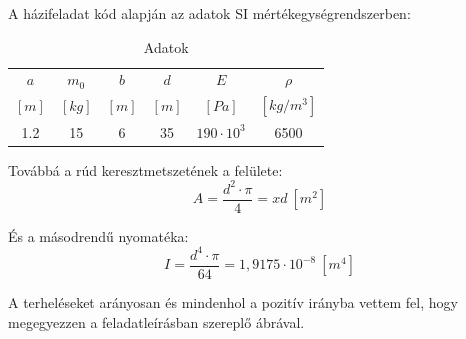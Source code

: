 \documentclass{article}
\begin{document}
	A házifeladat kód alapján az adatok SI mértékegységrendszerben:
	
	\begin{table}[h!]
		\begin{center}
			\caption{Adatok}
			\label{tab:table1}
			\begin{tabular}{c|c|c|c|c|c} %
				$a$ & $m_{0}$ & $b$ & $d$ & $E$ & $\rho$\\
				$[m]$ & $[kg]$ & $[m]$ & $[m]$ & $[Pa]$ & $[kg/m^{3}]$\\
				\hline
				1.2 & 15 & 6 & 35 & $190\cdot10^3$ & 6500\\
			\end{tabular}
		\end{center}
	\end{table}
	
	Továbbá a rúd keresztmetszetének a felülete:
	\begin{equation}
	A=\frac{d^{2}\cdot\pi}{4}=xd~[m^{2}]
	\end{equation}
	
	És a másodrendű nyomatéka:
	\begin{equation}
	I=\frac{d^4\cdot\pi}{64}=1,9175\cdot 10^{-8}~[m^{4}]
	\end{equation}
	
	A terheléseket arányosan és mindenhol a pozitív irányba vettem fel, hogy megegyezzen a feladatleírásban szereplő ábrával.
	
	\newcommand{\sugar}{2}
	\newcommand{\ab}{600}
	\newcommand{\bc}{120}
	\newcommand{\acv}{701}
	\newcommand{\ac}{720}
	\newcommand{\acvv}{735}
	
\end{document}
